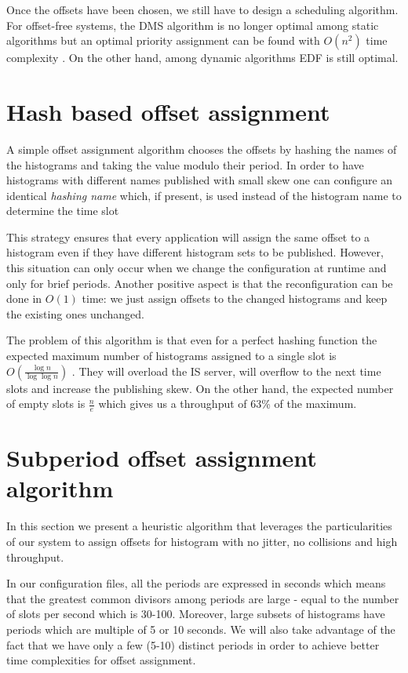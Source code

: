 Once the offsets have been chosen, we still have to design a scheduling algorithm. For offset-free systems, the DMS algorithm is no longer optimal among static algorithms but an optimal priority assignment can be found with $O(n^2)$ time complexity \citep{audsley2001priority}. On the other hand, among dynamic algorithms EDF is still optimal. 

\section*{Hash based offset assignment}

A simple offset assignment algorithm chooses the offsets by hashing the names of the histograms and taking the value modulo their period. In order to have histograms with different names published with small skew one can configure an identical \emph{hashing name} which, if present, is used instead of the histogram name to determine the time slot 

This strategy ensures that every application will assign the same offset to a histogram even if they have different histogram sets to be published. However, this situation can only occur when we change the configuration at runtime and only for brief periods. Another positive aspect is that the reconfiguration can be done in $O(1)$ time: we just assign offsets to the changed histograms and keep the existing ones unchanged.

The problem of this algorithm is that even for a perfect hashing function the expected maximum number of histograms assigned to a single slot is $O(\frac{\log n}{\log \log n})$ \citep{mitzenmacher1996power}. They will overload the IS server, will overflow to the next time slots and increase the publishing skew. On the other hand, the expected number of empty slots is $\frac n e$ which gives us a throughput of 63\% of the maximum.

\section*{Subperiod offset assignment algorithm}

In this section we present a heuristic algorithm that leverages the particularities of our system to assign offsets for histogram with no jitter, no collisions and high throughput. 

In our configuration files, all the periods are expressed in seconds which means that the greatest common divisors among periods are large - equal to the number of slots per second which is 30-100. Moreover, large subsets of histograms have periods which are multiple of 5 or 10 seconds. We will also take advantage of the fact that we have only a few (5-10) distinct periods in order to achieve better time complexities for offset assignment.

